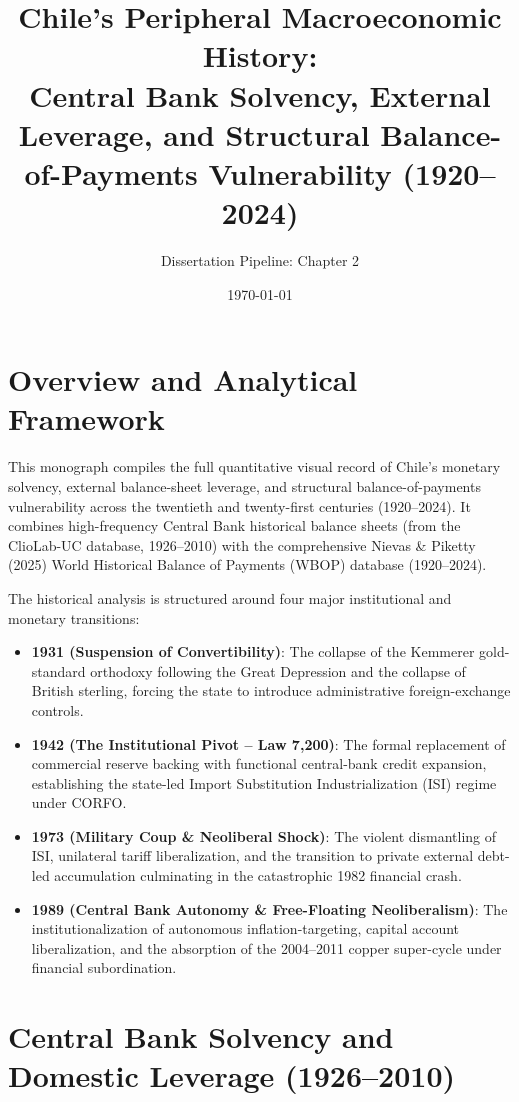 \documentclass[11pt]{article}
\title{\textbf{Chile's Peripheral Macroeconomic History:\\Central Bank Solvency, External Leverage, and Structural Balance-of-Payments Vulnerability (1920--2024)}}
\author{Dissertation Pipeline: Chapter 2}
\date{\today}
\begin{document}
\maketitle

\section*{Overview and Analytical Framework}

This monograph compiles the full quantitative visual record of Chile's monetary solvency, external balance-sheet leverage, and structural balance-of-payments vulnerability across the twentieth and twenty-first centuries (1920--2024). It combines high-frequency Central Bank historical balance sheets (from the ClioLab-UC database, 1926--2010) with the comprehensive Nievas \& Piketty (2025) World Historical Balance of Payments (WBOP) database (1920--2024).

The historical analysis is structured around four major institutional and monetary transitions:
\begin{itemize}
    \item \textbf{1931 (Suspension of Convertibility)}: The collapse of the Kemmerer gold-standard orthodoxy following the Great Depression and the collapse of British sterling, forcing the state to introduce administrative foreign-exchange controls.
    \item \textbf{1942 (The Institutional Pivot -- Law 7,200)}: The formal replacement of commercial reserve backing with functional central-bank credit expansion, establishing the state-led Import Substitution Industrialization (ISI) regime under CORFO.
    \item \textbf{1973 (Military Coup \& Neoliberal Shock)}: The violent dismantling of ISI, unilateral tariff liberalization, and the transition to private external debt-led accumulation culminating in the catastrophic 1982 financial crash.
    \item \textbf{1989 (Central Bank Autonomy \& Free-Floating Neoliberalism)}: The institutionalization of autonomous inflation-targeting, capital account liberalization, and the absorption of the 2004--2011 copper super-cycle under financial subordination.
\end{itemize}

\FloatBarrier
\section{Central Bank Solvency and Domestic Leverage (1926--2010)}
\end{document}
